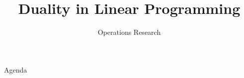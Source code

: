\documentclass[../main.tex]{subfiles}
\title{Duality in Linear Programming}
\subtitle{Operations Research} %
\begin{document}
\begin{frame}
  \maketitle
\end{frame}


\begin{frame}{Agenda}
  \tableofcontents
\end{frame}






\begin{frame}
  \maketitle
\end{frame}
\end{document}
